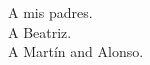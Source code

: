 
\begin{dedication} %

\hfill A mis padres. \\
\hfill A Beatriz. \\
\hfill A Martín and Alonso.

\end{dedication}

